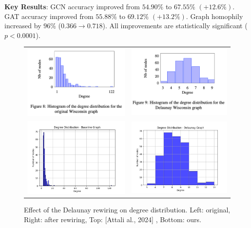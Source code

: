 \documentclass{article}
\theoremstyle{plain}
\theoremstyle{definition}
\theoremstyle{remark}
\begin{document}
\textbf{Key Results}:
    GCN accuracy improved from $54.90\%$ to $67.55\%$ $(+12.6\%)$.
    GAT accuracy improved from $55.88\%$ to $69.12\%$ $(+13.2\%)$.
    Graph homophily increased by $96\%$ ($0.366 \to  0.718$).
    All improvements are statistically significant ($p<0.0001$).

\begin{figure}[ht]
    \begin{tabular}{cc}
        \includegraphics[width=0.4\columnwidth]{figures/Wisconsin_degree_distrib_original.png} &
        \includegraphics[width=0.4\columnwidth]{figures/Wisconsin_degree_hist_original.png} \\
        \includegraphics[width=0.4\columnwidth]{figures/baseline_degree_dist_baseline_graph_20250314_180715.png} &
        \includegraphics[width=0.4\columnwidth]{figures/delaunay_degree_dist_delaunay_graph_20250314_180840.png}
    \end{tabular}
    \vskip -0.2in
    \caption{Effect of the Delaunay rewiring on degree distribution. 
                Left: original, Right: after rewiring, Top: [Attali al., 2024] \cite{attali2024delaunay}, Bottom: ours.}
    \label{fig:degree_dist}
\end{figure}
\end{document}
